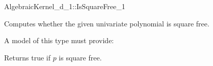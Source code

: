 \begin{ccRefFunctionObjectConcept}{AlgebraicKernel_d_1::IsSquareFree_1}

\ccDefinition
Computes whether the given univariate polynomial is square free. 
 
\ccRefines 
{}

\ccTypes
\ccGlue
{}

A model of this type must provide:

\ccOperations
{}

{Returns true if $p$ is square free.}

\ccSeeAlso
{}\\
\\

\end{ccRefFunctionObjectConcept} 


